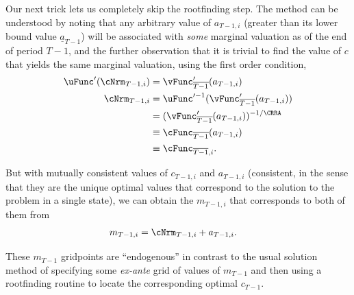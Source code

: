 \documentclass[titlepage, headings=optiontotocandhead]{\econtex}
\begin{document}
Our next trick lets us completely skip the rootfinding step.  The method can be understood by noting that
any arbitrary value of ${a}_{T-1,i}$ (greater than its lower bound
value $\underline{a}_{T-1}$) will be associated with \textit{some}
marginal valuation as of the end of period $T-1$, and the further
observation that it is trivial to find the value of ${c}$ that yields
the same marginal valuation, using the first order condition,
\begin{equation}\begin{gathered}\begin{aligned}
      \uFunc^{\prime}({\cNrm}_{T-1,i})  & = 
      \vFunc^{\prime}_{\overline{T-1}}({a}_{T-1,i}) \label{eq:eulerTm1}
      \\ {\cNrm}_{T-1,i}  & = \uFunc^{\prime-1}(\vFunc^{\prime}_{\overline{T-1}}({a}_{T-1,i}))
      \\  & = (\vFunc^{\prime}_{\overline{T-1}}({a}_{T-1,i}))^{-1/\CRRA}
      \\  & \equiv  \cFunc_{\overline{T-1}}({a}_{T-1,i})
      \\  & \equiv  \cFunc_{\overline{T-1},i}
      .
    \end{aligned}\end{gathered}\end{equation}

But with mutually consistent values of ${c}_{T-1,i}$ and ${a}_{T-1,i}$ (consistent, in the sense that they are the unique optimal
values that correspond to the solution to the problem in a single state), we can
obtain the ${m}_{T-1,i}$ that corresponds to both of them from
\begin{equation}\begin{gathered}\begin{aligned}
      {m}_{T-1,i}  & = {\cNrm}_{T-1,i}+{a}_{T-1,i}.
    \end{aligned}\end{gathered}\end{equation}

These ${m}_{T-1}$ gridpoints are ``endogenous'' in contrast to the usual solution method of
specifying some \textit{ex-ante} grid of values of ${m}_{T-1}$ and then using a rootfinding
routine to locate the corresponding optimal ${c}_{T-1}$.
\end{document}
